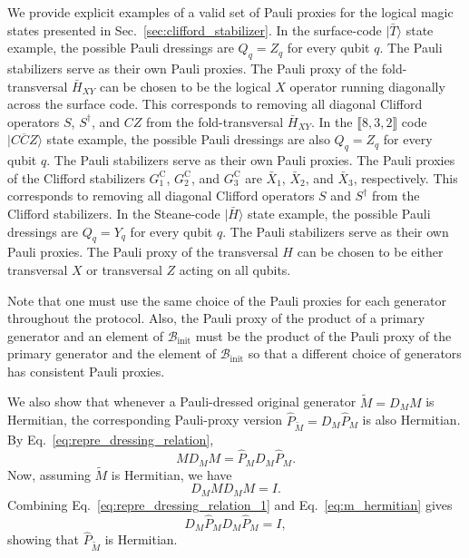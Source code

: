 \documentclass[
 reprint,
 amsmath,amssymb,
 pra,superscriptaddress, nofootinbib
]{revtex4-2}
\theoremstyle{definition}
\theoremstyle{plain}
\begin{document}
We provide explicit examples of a valid set of Pauli proxies for the logical magic states presented in Sec.~\ref{sec:clifford_stabilizer}.
In the surface-code $|\bar{T}\rangle$ state example, the possible Pauli dressings are $Q_q=Z_q$ for every qubit $q$. 
The Pauli stabilizers serve as their own Pauli proxies.
The Pauli proxy of the fold-transversal $\bar{H}_{XY}$ can be chosen to be the logical $X$ operator running diagonally across the surface code. 
This corresponds to removing all diagonal Clifford operators $S$, $S^\dagger$, and $CZ$ from the fold-transversal $\bar{H}_{XY}$.
In the $\llbracket 8,3,2 \rrbracket$ code $|\overline{CCZ}\rangle$ state example, the possible Pauli dressings are also $Q_q=Z_q$ for every qubit $q$. The Pauli stabilizers serve as their own Pauli proxies.
The Pauli proxies of the Clifford stabilizers $G^\mathrm{C}_1$, $G^\mathrm{C}_2$, and $G^\mathrm{C}_3$ are $\bar{X}_1$, $\bar{X}_2$, and $\bar{X}_3$, respectively.
This corresponds to removing all diagonal Clifford operators $S$ and $S^\dagger$ from the Clifford stabilizers.
In the Steane-code $|\bar{H}\rangle$ state example, the possible Pauli dressings are $Q_q=Y_q$ for every qubit $q$. The Pauli stabilizers serve as their own Pauli proxies. The Pauli proxy of the transversal $H$ can be chosen to be either transversal $X$ or transversal $Z$ acting on all qubits. 

Note that one must use the same choice of the Pauli proxies for each generator throughout the protocol.
Also, the Pauli proxy of the product of a primary generator and an element of $\mathcal{B}_{\mathrm{init}}$ must be the product of the Pauli proxy of the primary generator and the element of $\mathcal{B}_{\mathrm{init}}$ so that a different choice of generators has consistent Pauli proxies. 

We also show that whenever a Pauli-dressed original generator $\tilde{M} = D_M M$ is Hermitian, the corresponding Pauli-proxy version $\hat{P}_{\tilde{M}} = D_M\hat{P}_M$ is also Hermitian.
By Eq.~\eqref{eq:repre_dressing_relation}, 
\begin{equation}
    MD_MM=\hat{P}_MD_M\hat{P}_M.
    \label{eq:repre_dressing_relation_1}
\end{equation}
Now, assuming $\tilde{M}$ is Hermitian, we have
\begin{equation}
    D_MMD_MM=I.
    \label{eq:m_hermitian}
\end{equation}
Combining Eq.~\eqref{eq:repre_dressing_relation_1} and Eq.~\eqref{eq:m_hermitian} gives
\begin{equation}
    D_M\hat{P}_MD_M\hat{P}_M=I,
\end{equation}
showing that $\hat{P}_{\tilde{M}}$ is Hermitian.
\end{document}
